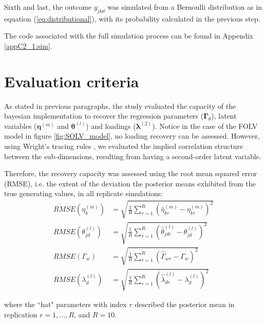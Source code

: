Sixth and last, the outcome $y_{jkd}$ was simulated from a Bernoulli distribution as in equation (\ref{eq:distributional}), with its probability calculated in the previous step.

The code associated with the full simulation process can be found in Appendix \ref{appC2_1:sim}.


\section{Evaluation criteria}

As stated in previous paragraphs, the study evaluated the capacity of the bayesian implementation to recover the regression parameters ($\pmb{\Gamma}_{\theta}$), latent variables ($\pmb{\eta}^{(m)}$ and $\pmb{\theta}^{(l)}$) and loadings ($\pmb{\lambda}^{(2)}$). Notice in the case of the FOLV model in figure \ref{fig:SOLV_model}, no loading recovery can be assessed. However, using Wright's tracing rules \cite{Beaujean_2014}, we evaluated the implied correlation structure between the sub-dimensions, resulting from having a second-order latent variable.

Therefore, the recovery capacity was assessed using the root mean squared error (RMSE), i.e. the extent of the deviation the posterior means exhibited from the true generating values, in all replicate simulations:
%
\begin{align}
	RMSE \left( \eta^{(m)}_{k} \right) &=\sqrt{\frac{1}{R} \sum_{r=1}^{R} \left( \hat{\eta}^{(m)}_{kr} - \eta^{(m)}_{kr} \right)^2} \\
	RMSE \left( \theta^{(l)}_{jd} \right) &=\sqrt{\frac{1}{R} \sum_{r=1}^{R} \left( \hat{\theta}^{(l)}_{jdr} - \theta^{(l)}_{jd} \right)^2} \\
	RMSE \left( \Gamma_{w} \right) &=\sqrt{\frac{1}{R} \sum_{r=1}^{R} \left( \hat{\Gamma}_{wr} - \Gamma_{w} \right)^2} \\
	RMSE \left( \lambda^{(l)}_{d} \right) &=\sqrt{\frac{1}{R} \sum_{r=1}^{R} \left( \hat{\lambda}^{(l)}_{dr} - \lambda^{(l)}_{d} \right)^2}
\end{align}

\noindent where the ``hat" parameters with index $r$ described the posterior mean in replication $r=1, \dots, R$, and $R=10$.

